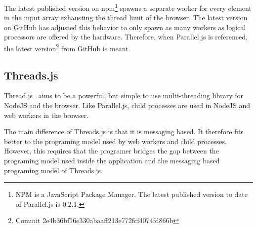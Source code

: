 The latest published version on npm\footnote{NPM is a JavaScript Package Manager. The latest published version to date of Parallel.js is 0.2.1.} spawns a separate worker for every element in the input array exhausting the thread limit of the browser. The latest version on GitHub has adjusted this behavior to only spawn as many workers as logical processors are offered by the hardware. Therefore, when Parallel.js is referenced, the latest version\footnote{Commit 2e4b36bf16e330abaaff213e772fcf4074fd866b} from GitHub is meant.

\subsection{Threads.js}
Thread.js~\cite{Wermke2016} aims to be a powerful, but simple to use multi-threading library for NodeJS and the browser. Like Parallel.js, child processes are used in NodeJS and web workers in the browser.

The main difference of Threads.js is that it is messaging based. It therefore fits better to the programing model used by web workers and child processes. However, this requires that the programer bridges the gap between the programing model used inside the application and the messaging based programing model of Threads.js.